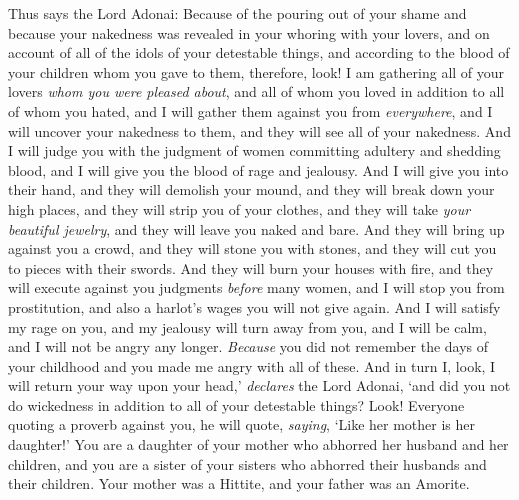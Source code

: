 \begin{biblechapter}
\verse Thus says the Lord Adonai: Because of the pouring out of your shame and because your nakedness was revealed in your whoring with your lovers, and on account of all of the idols of your detestable things, and according to the blood of your children whom you gave to them,
\verse therefore, look! I am gathering all of your lovers \textit{whom you were pleased about}, and all of whom you loved in addition to all of whom you hated, and I will gather them against you from \textit{everywhere}, and I will uncover your nakedness to them, and they will see all of your nakedness.
\verse And I will judge you with the judgment of women committing adultery and shedding blood, and I will give you the blood of rage and jealousy.
\verse And I will give you into their hand, and they will demolish your mound, and they will break down your high places, and they will strip you of your clothes, and they will take \textit{your beautiful jewelry}, and they will leave you naked and bare.
\verse And they will bring up against you a crowd, and they will stone you with stones, and they will cut you to pieces with their swords.
\verse And they will burn your houses with fire, and they will execute against you judgments \textit{before} many women, and I will stop you from prostitution, and also a harlot’s wages you will not give again.
\verse And I will satisfy my rage on you, and my jealousy will turn away from you, and I will be calm, and I will not be angry any longer.
\verse \textit{Because} you did not remember the days of your childhood and you made me angry with all of these. And in turn I, look, I will return your way upon your head,’ \textit{declares} the Lord Adonai, ‘and did you not do wickedness in addition to all of your detestable things?
\verse Look! Everyone quoting a proverb against you, he will quote, \textit{saying}, ‘Like her mother is her daughter!’
\verse You are a daughter of your mother who abhorred her husband and her children, and you are a sister of your sisters who abhorred their husbands and their children. Your mother was a Hittite, and your father was an Amorite.

\end{biblechapter}
